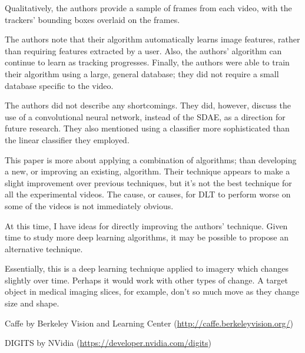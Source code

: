 \documentclass[11pt]{article}
\begin{document}
\begin{description}[leftmargin=0in]
        Qualitatively, the authors provide a sample of frames from each video,
        with the trackers' bounding boxes overlaid on the frames.

    \item [Contributions] The authors note that their algorithm automatically
        learns image features, rather than requiring features extracted by a
        user. Also, the authors' algorithm can continue to learn as tracking
        progresses. Finally, the authors were able to train their algorithm
        using a large, general database; they did not require a small database
        specific to the video.

    \item [Shortcomings] The authors did not describe any shortcomings. They
        did, however, discuss the use of a convolutional neural network, instead
        of the SDAE, as a direction for future research. They also mentioned
        using a classifier more sophisticated than the linear classifier they
        employed.

    \item [Self Evaluation] This paper is more about applying a combination of
        algorithms; than developing a new, or improving an existing, algorithm.
        Their technique appears to make a slight improvement over previous
        techniques, but it's not the best technique for all the experimental
        videos. The cause, or causes, for DLT to perform worse on some of the
        videos is not immediately obvious.

    \item [Improvements] At this time, I have ideas for directly improving the
        authors' technique. Given time to study more deep learning algorithms,
        it may be possible to propose an alternative technique.

    \item [Applications] Essentially, this is a deep learning technique applied
        to imagery which changes slightly over time. Perhaps it would work with
        other types of change. A target object in medical imaging slices, for
        example, don't so much move as they change size and shape.

    \item [Packages]

        Caffe by Berkeley Vision and Learning Center
        (\url{http://caffe.berkeleyvision.org/})

        DIGITS by NVidia (\url{https://developer.nvidia.com/digits})
\end{description}

 
\end{document}
